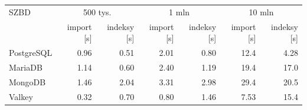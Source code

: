 \begin{tabular}{lrrrrrr}
\toprule
SZBD & \multicolumn{2}{c}{500 tys.} & \multicolumn{2}{c}{1 mln} & \multicolumn{2}{c}{10 mln} \\
& import [s] & indeksy [s] & import [s] & indeksy [s] & import [s] & indeksy [s] \\
\midrule
PostgreSQL & \num{0.96} & \num{0.51} & \num{2.01} & \num{0.80} & \num{12.4} & \num{4.28} \\
MariaDB & \num{1.14} & \num{0.60} & \num{2.40} & \num{1.19} & \num{19.4} & \num{17.0} \\
MongoDB & \num{1.46} & \num{2.04} & \num{3.31} & \num{2.98} & \num{29.4} & \num{20.5} \\
Valkey & \num{0.32} & \num{0.70} & \num{0.80} & \num{1.46} & \num{7.53} & \num{15.4} \\
\bottomrule
\end{tabular}

